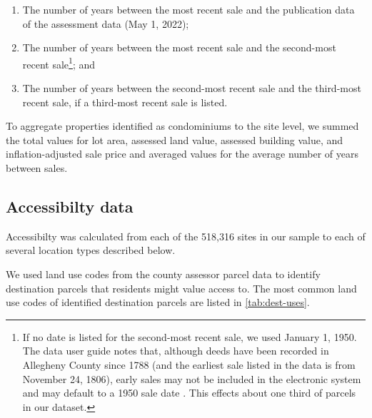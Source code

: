 \documentclass[
]{book}
\providecommand{\tightlist}{%
  \setlength{\itemsep}{0pt}\setlength{\parskip}{0pt}}
\theoremstyle{definition}
\theoremstyle{definition}
\theoremstyle{definition}
\theoremstyle{definition}
\theoremstyle{remark}
\begin{document}
\begin{enumerate}
\def\labelenumi{\arabic{enumi}.}
\tightlist
\item
  The number of years between the most recent sale and the publication data of the assessment data (May 1, 2022);
\item
  The number of years between the most recent sale and the second-most recent sale\footnote{If no date is listed for the second-most recent sale, we used January 1, 1950. The data user guide notes that, although deeds have been recorded in Allegheny County since 1788 (and the earliest sale listed in the data is from November 24, 1806), early sales may not be included in the electronic system and may default to a 1950 sale date \citep{western_pennsylvania_regional_data_center_allegheny_2017}. This effects about one third of parcels in our dataset.}; and
\item
  The number of years between the second-most recent sale and the third-most recent sale, if a third-most recent sale is listed.
\end{enumerate}

To aggregate properties identified as condominiums to the site level, we summed
the total values for lot area, assessed land value, assessed building value, and
inflation-adjusted sale price and averaged values for the average number of
years between sales.

\hypertarget{accessibilty-data}{%
\subsection{Accessibilty data}\label{accessibilty-data}}

Accessibilty was calculated from each of the 518,316 sites in our sample to
each of several location types described below.

We used land use codes from the county assessor parcel data to identify
destination parcels that residents might value access to. The most common
land use codes of identified destination parcels are listed in \ref{tab:dest-uses}.
\end{document}
